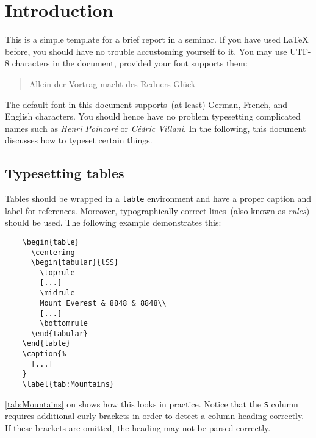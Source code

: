 \section{Introduction}

This is a simple template for a brief report in a seminar. If you have
used \LaTeX{} before, you should have no trouble accustoming yourself to
it. You may use UTF-8 characters in the document, provided your font supports
them:
%
\begin{quote}
  Allein der Vortrag macht des Redners Glück
\end{quote}
%
The default font in this document supports~(at least) German, French,
and English characters. You should hence have no problem typesetting
complicated names such as \emph{Henri Poincaré} or \emph{Cédric
Villani}. In the following, this document discusses how to typeset
certain things.

\subsection{Typesetting tables}

Tables should be wrapped in a \verb|table| environment and have a proper
caption and label for references. Moreover, typographically correct
lines~(also known as \emph{rules}) should be used. The following example
demonstrates this:
%
\begin{center}
  \begin{verbatim}
    \begin{table}
      \centering
      \begin{tabular}{lSS}
        \toprule
        [...]
        \midrule
        Mount Everest & 8848 & 8848\\
        [...]
        \bottomrule
      \end{tabular}
    \end{table}
    \caption{%
      [...]
    }
    \label{tab:Mountains}
  \end{verbatim}
\end{center}
%
\autoref{tab:Mountains} on  shows how this
looks in practice.
%
Notice that the \verb|S| column requires additional curly brackets in
order to detect a column heading correctly. If these brackets are
omitted, the heading may not be parsed correctly.

